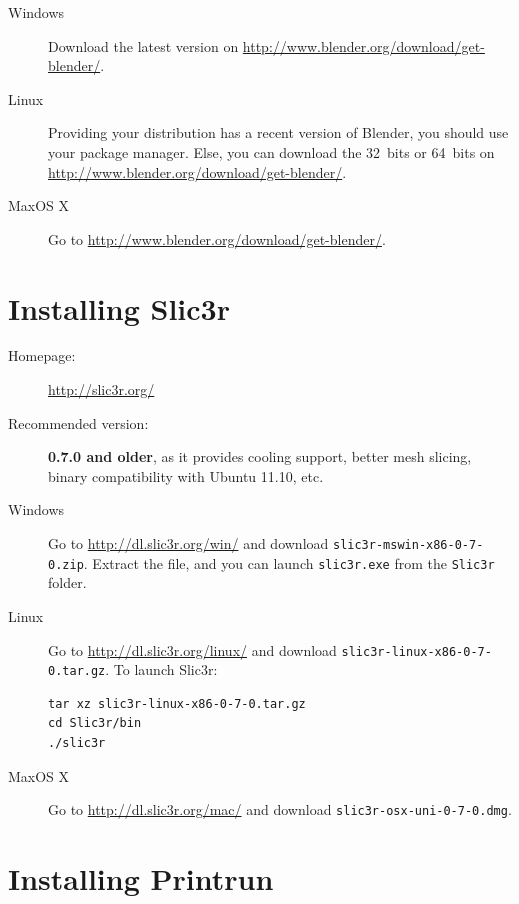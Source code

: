 \documentclass{article}
\begin{document}
\begin{description}
	\item[Windows] Download the latest version on \url{http://www.blender.org/download/get-blender/}.
	\item[Linux] Providing your distribution has a recent version of Blender, you should use your package manager. Else, you can download the 32~bits or 64~bits on \url{http://www.blender.org/download/get-blender/}.
	\item[MaxOS X] Go to \url{http://www.blender.org/download/get-blender/}.
\end{description}

\section{Installing Slic3r}

\begin{description}
	\item[Homepage:] \url{http://slic3r.org/}
	\item[Recommended version:] \textbf{0.7.0 and older}, as it provides cooling support, better mesh slicing, binary compatibility with Ubuntu 11.10, etc.
\end{description}

\begin{description}
	\item[Windows] Go to \url{http://dl.slic3r.org/win/} and download \texttt{slic3r-mswin-x86-0-7-0.zip}. Extract the file, and you can launch \texttt{slic3r.exe} from the \texttt{Slic3r} folder.
	\item[Linux] Go to \url{http://dl.slic3r.org/linux/} and download \texttt{slic3r-linux-x86-0-7-0.tar.gz}. To launch Slic3r:
		\begin{verbatim}
tar xz slic3r-linux-x86-0-7-0.tar.gz
cd Slic3r/bin
./slic3r
		\end{verbatim}
	\item[MaxOS X] Go to \url{http://dl.slic3r.org/mac/} and download \texttt{slic3r-osx-uni-0-7-0.dmg}.
\end{description}

\section{Installing Printrun}
\end{document}
